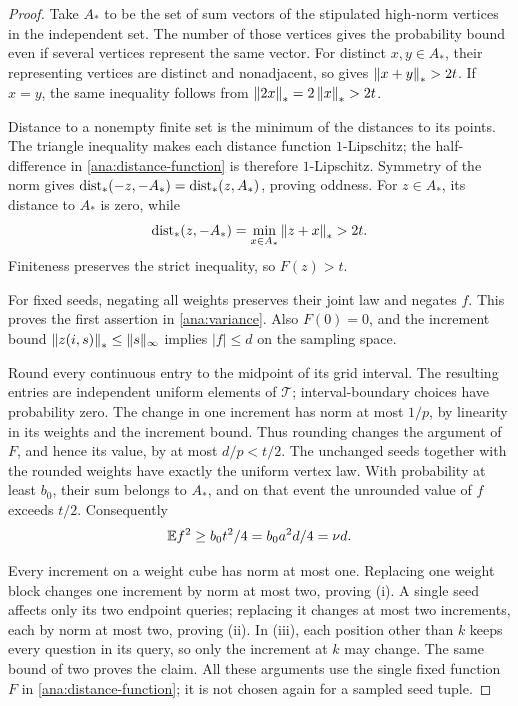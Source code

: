 \begin{proof}
Take \(A_*\) to be the set of sum vectors of the stipulated high-norm
vertices in the independent set. The number of those vertices gives
the probability bound even if several vertices represent the same
vector. For distinct \(x,y\in A_*\), their representing vertices
are distinct and nonadjacent, so  gives
\(\left\|x+y\right\|_*>2t\). If \(x=y\), the same inequality follows from
\(\left\|2x\right\|_*=2\left\|x\right\|_*>2t\).

Distance to a nonempty finite set is the minimum of the distances to
its points. The triangle inequality makes each distance function
\(1\)-Lipschitz; the half-difference in
\eqref{ana:distance-function} is therefore \(1\)-Lipschitz.
Symmetry of the norm gives
\(\operatorname{dist}_*(-z,-A_*)=\operatorname{dist}_*(z,A_*)\), proving oddness. For
\(z\in A_*\), its distance to \(A_*\) is zero, while
\[
 \operatorname{dist}_*(z,-A_*)=\min_{x\in A_*}\left\|z+x\right\|_*>2t.
\]
Finiteness preserves the strict inequality, so \(F(z)>t\).

For fixed seeds, negating all weights preserves their joint law and
negates \(f\). This proves the first assertion in
\eqref{ana:variance}. Also \(F(0)=0\), and the increment bound
\(\left\|z(i,s)\right\|_*\leq\|s\|_\infty\) implies \(|f|\leq d\)
on the sampling space.

Round every continuous entry to the midpoint of its grid interval.
The resulting entries are independent uniform elements of
\(\mathcal T\); interval-boundary choices have probability zero.
The change in one increment has norm at most \(1/p\), by linearity
in its weights and the increment bound. Thus rounding changes the
argument of \(F\), and hence its value, by at most \(d/p<t/2\).
The unchanged seeds together with the rounded weights have exactly
the uniform vertex law.
With probability at least \(b_0\), their sum belongs to \(A_*\),
and on that event the unrounded value of \(f\) exceeds \(t/2\).
Consequently
\[
 \mathbb E f^2\geq b_0t^2/4=b_0a^2d/4=\nu d.
\]

Every increment on a weight cube has norm at most one. Replacing
one weight block changes one increment by norm at most two, proving
\textup{(i)}. A single seed affects only its two endpoint queries;
replacing it changes at most two increments, each by norm at most
two, proving \textup{(ii)}. In \textup{(iii)}, each position other
than \(k\) keeps every question in its query, so only the increment
at \(k\) may change. The same bound of two proves the claim.
All these arguments use the single fixed function \(F\) in
\eqref{ana:distance-function}; it is not chosen again for a sampled
seed tuple.
\end{proof}
